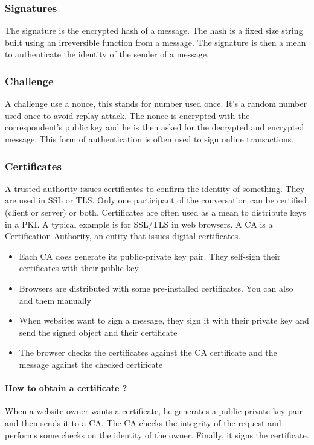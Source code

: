 \subsubsection{Signatures}
The signature is the encrypted hash of a message.
The hash is a fixed size string built using an irreversible function from a
message.
The signature is then a mean to authenticate the identity of the sender of a
message.

\subsubsection{Challenge}
A challenge use a nonce, this stands for number used once.
It's a random number used once to avoid replay attack.
The nonce is encrypted with the correspondent's public key and he is then
asked for the decrypted and encrypted message.
This form of authentication is often used to sign online transactions.

\subsubsection{Certificates}
A trusted authority issues certificates to confirm the identity of something.
They are used in SSL or TLS.
Only one participant of the conversation can be certified (client or server)
or both.
Certificates are often used as a mean to distribute keys in a PKI. A typical
example is for SSL/TLS in web browsers. A CA is a Certification Authority, an
entity that issues digital certificates.
\begin{itemize}
\item Each CA does generate its public-private key pair. They self-sign their
certificates with their public key
\item Browsers are distributed with some pre-installed certificates. You can
also add them manually
\item When websites want to sign a message, they sign it with their private
key and send the signed object and their certificate
\item The browser checks the certificates against the CA certificate and the
message against the checked certificate
\end{itemize}

\paragraph{How to obtain a certificate ?}
When a website owner wants a certificate, he generates a public-private key
pair and then sends it to a CA.
The CA checks the integrity of the request and performs some checks on the
identity of the owner. Finally, it signs the certificate.

